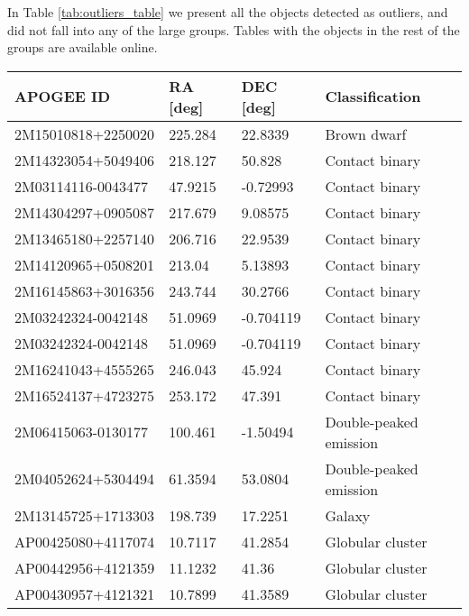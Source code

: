 \documentclass[fleqn,usenatbib]{mnras}
\begin{document}
In Table \ref{tab:outliers_table} we present all the objects detected as outliers, and did not fall into any of the large groups. Tables with the objects in the rest of the groups are available online.

\begin{table*}
\centering
  \begin{tabular}{llll}
  \toprule
  APOGEE ID  &       RA [deg] &       DEC [deg] &                       Classification                                     \\
  \midrule
  2M15010818+2250020 &  225.284 &   22.8339 &                          Brown dwarf \\
  2M14323054+5049406 &  218.127 &    50.828 &                       Contact binary \\
  2M03114116-0043477 &  47.9215 &  -0.72993 &                       Contact binary \\
  2M14304297+0905087 &  217.679 &   9.08575 &                       Contact binary \\
  2M13465180+2257140 &  206.716 &   22.9539 &                       Contact binary \\
  2M14120965+0508201 &   213.04 &   5.13893 &                       Contact binary \\
  2M16145863+3016356 &  243.744 &   30.2766 &                       Contact binary \\
  2M03242324-0042148 &  51.0969 & -0.704119 &                       Contact binary \\
  2M03242324-0042148 &  51.0969 & -0.704119 &                       Contact binary \\
  2M16241043+4555265 &  246.043 &    45.924 &                       Contact binary \\
  2M16524137+4723275 &  253.172 &    47.391 &                       Contact binary \\
  2M06415063-0130177 &  100.461 &  -1.50494 &               Double-peaked emission \\
  2M04052624+5304494 &  61.3594 &   53.0804 &               Double-peaked emission \\
  2M13145725+1713303 &  198.739 &   17.2251 &                               Galaxy \\
  AP00425080+4117074 &  10.7117 &   41.2854 &                     Globular cluster \\
  AP00442956+4121359 &  11.1232 &     41.36 &                     Globular cluster \\
  AP00430957+4121321 &  10.7899 &   41.3589 &                     Globular cluster \\

\end{tabular}
\end{table*}
\end{document}
